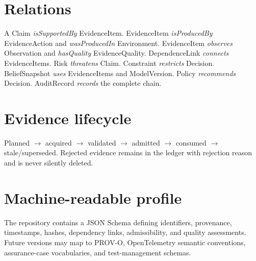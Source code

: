 \documentclass[11pt]{article}
\begin{document}
\section{Relations}
A Claim \emph{isSupportedBy} EvidenceItem. EvidenceItem \emph{isProducedBy} EvidenceAction and \emph{wasProducedIn} Environment. EvidenceItem \emph{observes} Observation and \emph{hasQuality} EvidenceQuality. DependenceLink \emph{connects} EvidenceItems. Risk \emph{threatens} Claim. Constraint \emph{restricts} Decision. BeliefSnapshot \emph{uses} EvidenceItems and ModelVersion. Policy \emph{recommends} Decision. AuditRecord \emph{records} the complete chain.
\section{Evidence lifecycle}
Planned $\rightarrow$ acquired $\rightarrow$ validated $\rightarrow$ admitted $\rightarrow$ consumed $\rightarrow$ stale/superseded. Rejected evidence remains in the ledger with rejection reason and is never silently deleted.
\section{Machine-readable profile}
The repository contains a JSON Schema defining identifiers, provenance, timestamps, hashes, dependency links, admissibility, and quality assessments. Future versions may map to PROV-O, OpenTelemetry semantic conventions, assurance-case vocabularies, and test-management schemas.
\end{document}
